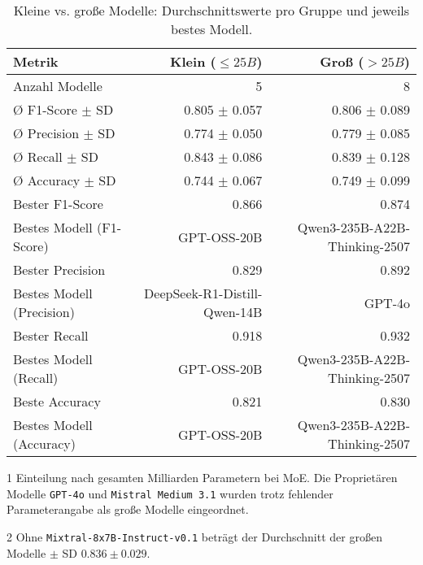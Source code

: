 \begin{table}[htbp]
 \centering
 \caption{Kleine vs. große Modelle: Durchschnittswerte pro Gruppe und jeweils bestes Modell.}
 \label{tab:small-vs-large}
 \begin{adjustbox}{width=\textwidth}
  \begin{threeparttable}[width=\textwidth]
   \begin{tabular}[width=\textwidth]{l r r}
    \toprule
    \textbf{Metrik} & \textbf{Klein} ($\leq 25B$) & \textbf{Groß} ($> 25B$) \\
    \midrule
    Anzahl Modelle\tnote{1}             & 5                         & 8 \\
    Ø F1-Score $\pm$ SD\tnote{2}      & 0.805 $\pm$ 0.057                     & 0.806 $\pm$ 0.089 \\
    Ø Precision $\pm$ SD    & 0.774 $\pm$ 0.050                     & 0.779 $\pm$ 0.085 \\
    Ø Recall $\pm$ SD       & 0.843 $\pm$ 0.086                     & 0.839 $\pm$ 0.128 \\
    Ø Accuracy $\pm$ SD     & 0.744 $\pm$ 0.067                     & 0.749 $\pm$ 0.099 \\
    Bester F1-Score & 0.866                     & 0.874 \\
    Bestes Modell (F1-Score)   & GPT-OSS-20B               & Qwen3-235B-A22B-Thinking-2507 \\
    Bester Precision & 0.829                     & 0.892 \\
    Bestes Modell (Precision) & DeepSeek-R1-Distill-Qwen-14B        & GPT-4o \\
    Bester Recall & 0.918                     & 0.932 \\
    Bestes Modell (Recall)      & GPT-OSS-20B      & Qwen3-235B-A22B-Thinking-2507 \\
    Beste Accuracy & 0.821                     & 0.830 \\
    Bestes Modell (Accuracy)     & GPT-OSS-20B               & Qwen3-235B-A22B-Thinking-2507 \\
    \bottomrule
   \end{tabular}
   \begin{tablenotes}
    \footnotesize
    \item[1] Einteilung nach gesamten Milliarden Parametern bei \ac{MoE}. Die Proprietären Modelle \texttt{GPT-4o} und \texttt{Mistral Medium 3.1} wurden trotz fehlender Parameterangabe als große Modelle eingeordnet.
    \item[2] Ohne \texttt{Mixtral-8x7B-Instruct-v0.1} beträgt der Durchschnitt der großen Modelle $\pm$ SD $0.836 \pm 0.029$.
   \end{tablenotes}
  \end{threeparttable}
 \end{adjustbox}
\end{table}

